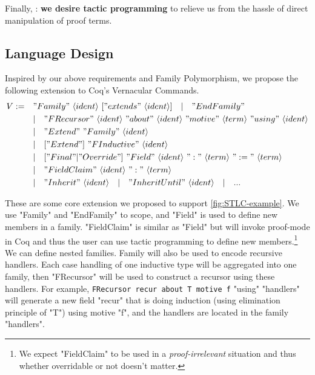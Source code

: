 Finally, : \textbf{we desire tactic
programming} to relieve us from the hassle of direct manipulation of proof terms.

\subsection{Language Design}
Inspired by our above requirements and Family Polymorphism, we propose
the following extension to Coq's Vernacular Commands.
\begin{align*}
  V := \quad &"Family"~\langle ident\rangle~["extends"~\langle ident\rangle] 
  \quad |\quad "EndFamily" \\
  & |\quad "FRecursor"~\langle ident\rangle~"about"~\langle ident\rangle~"motive"~\langle term\rangle~"using"~\langle ident\rangle \\
  & |\quad "Extend"~"Family"~\langle ident\rangle \\ 
  & |\quad ["Extend"]~"FInductive"~\langle ident\rangle \\ 
  & |\quad ["Final" | "Override"]~"Field"~\langle ident\rangle~":"~\langle term \rangle~":="~\langle term \rangle \\
  & | \quad "FieldClaim"~\langle ident\rangle~":"~\langle term \rangle \\
  & | \quad "Inherit"~\langle ident\rangle \quad | \quad "Inherit Until"~\langle ident\rangle \quad | \quad ...
\end{align*}

These are some core extension we proposed to support \cref{fig:STLC-example}. We use "Family" and "EndFamily" to scope, and "Field" is used to define new members in a family. "FieldClaim" is similar as "Field" but will invoke proof-mode in Coq and thus the user can use tactic programming to define new members.\footnote{We expect "FieldClaim" to be used in a \textit{proof-irrelevant} situation and thus whether overridable or not doesn't matter.}
We can define nested families.
Family will also be used to encode recursive handlers. Each case
handling of one inductive type will be aggregated into one family, then
"FRecursor" will be used to construct a recursor using these handlers.
For example, \texttt{FRecursor recur about T motive f} "using"
"handlers" will generate a new field "recur" that is doing induction
(using elimination principle of "T") using motive "f", and the handlers
are located in the family "handlers".

